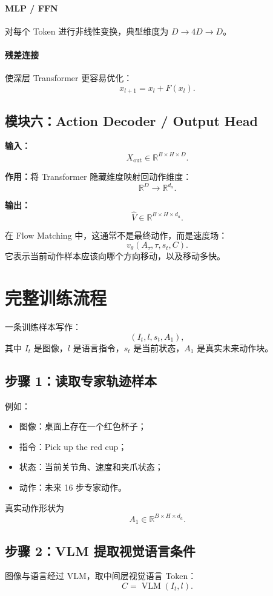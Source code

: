 \documentclass[UTF8,11pt,a4paper]{ctexart}
\begin{document}
\paragraph{MLP / FFN}对每个 Token 进行非线性变换，典型维度为 $D\rightarrow 4D\rightarrow D$。

\paragraph{残差连接}使深层 Transformer 更容易优化：
\[
x_{l+1}=x_l+F(x_l).
\]

\subsection{模块六：Action Decoder / Output Head}

\textbf{输入：}
\[
X_{\text{out}}\in\mathbb{R}^{B\times H\times D}.
\]

\textbf{作用：}将 Transformer 隐藏维度映射回动作维度：
\[
\mathbb{R}^{D}\rightarrow\mathbb{R}^{d_a}.
\]

\textbf{输出：}
\[
\hat V\in\mathbb{R}^{B\times H\times d_a}.
\]

在 Flow Matching 中，这通常不是最终动作，而是速度场：
\[
v_\theta(A_\tau,\tau,s_t,C).
\]
它表示当前动作样本应该向哪个方向移动，以及移动多快。

\section{完整训练流程}

一条训练样本写作：
\[
(I_t,l,s_t,A_1),
\]
其中 $I_t$ 是图像，$l$ 是语言指令，$s_t$ 是当前状态，$A_1$ 是真实未来动作块。

\subsection{步骤 1：读取专家轨迹样本}
例如：
\begin{itemize}
  \item 图像：桌面上存在一个红色杯子；
  \item 指令：Pick up the red cup；
  \item 状态：当前关节角、速度和夹爪状态；
  \item 动作：未来 16 步专家动作。
\end{itemize}

真实动作形状为
\[
A_1\in\mathbb{R}^{B\times H\times d_a}.
\]

\subsection{步骤 2：VLM 提取视觉语言条件}
图像与语言经过 VLM，取中间层视觉语言 Token：
\[
C=\operatorname{VLM}(I_t,l).
\]
\end{document}
